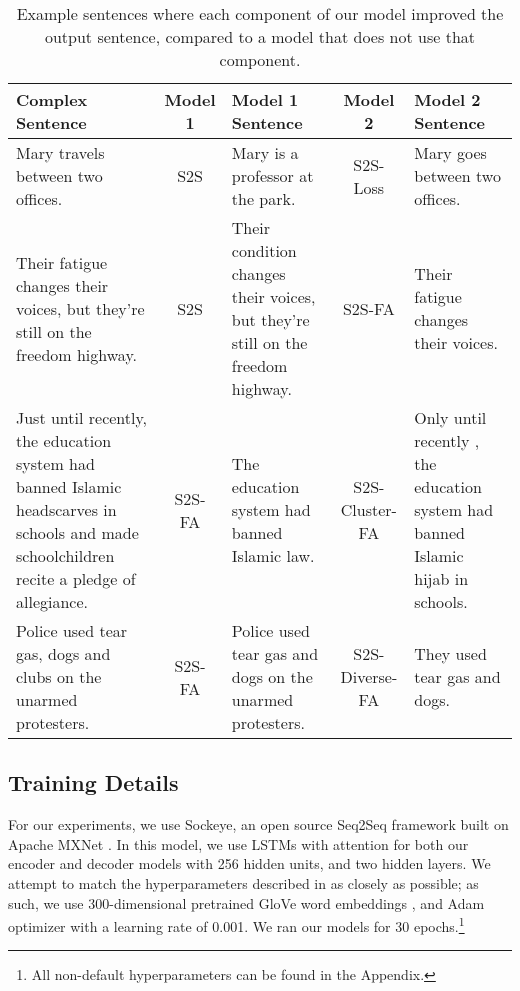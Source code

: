\documentclass[11pt,a4paper]{article}
\begin{document}
\begin{table*}
\begin{center}
\begin{tabular}{| L{4cm} | c | L{3.5cm} | c | L{3cm} |} \hline
\textbf{Complex Sentence} & \textbf{Model 1} & \textbf{Model 1 Sentence} & \textbf{Model 2} & \textbf{Model 2 Sentence} \\ \hline

{\small Mary travels between two offices.} & S2S & {\small Mary is a professor at the park.} & S2S-Loss & {\small Mary goes between two offices.} \\ \hline

{\small Their fatigue changes their voices, but they're still on the freedom highway.} & S2S & {\small Their condition changes their voices, but they're still on the freedom highway.} & S2S-FA & {\small Their fatigue changes their voices.} \\ \hline

{\scriptsize Just until recently, the education system had banned Islamic headscarves in schools and made schoolchildren recite a pledge of allegiance.} & S2S-FA & {\small The education system had banned Islamic law.} & S2S-Cluster-FA & {\small Only until recently , the education system had banned Islamic hijab in schools.} \\ \hline

{\small Police used tear gas, dogs and clubs on the unarmed protesters.} & S2S-FA & {\small Police used tear gas and dogs on the unarmed protesters.}& S2S-Diverse-FA & {\small They used tear gas and dogs.}\\ \hline
\end{tabular}
   \caption{\label{examples}Example sentences where each component of our model improved the output sentence, compared to a model that does not use that component.}
\end{center}
\end{table*}

\subsection{Training Details}

For our experiments, we use Sockeye, an open source Seq2Seq framework built on Apache MXNet \cite{hieber2017sockeye,chen2015mxnet}. In this model, we use LSTMs with attention for both our encoder and decoder models with 256 hidden units, and two hidden layers. We attempt to match the hyperparameters described in  as closely as possible; as such, we use 300-dimensional pretrained GloVe word embeddings \cite{pennington2014glove}, and Adam optimizer \cite{kingma2015adam} with a learning rate of 0.001. We ran our models for 30 epochs.\footnote{All non-default hyperparameters can be found in the Appendix.}
\end{document}
